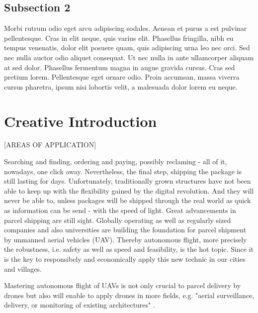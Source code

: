 
\subsection{Subsection 2}
Morbi rutrum odio eget arcu adipiscing sodales. Aenean et purus a est pulvinar pellentesque. Cras in elit neque, quis varius elit. Phasellus fringilla, nibh eu tempus venenatis, dolor elit posuere quam, quis adipiscing urna leo nec orci. Sed nec nulla auctor odio aliquet consequat. Ut nec nulla in ante ullamcorper aliquam at sed dolor. Phasellus fermentum magna in augue gravida cursus. Cras sed pretium lorem. Pellentesque eget ornare odio. Proin accumsan, massa viverra cursus pharetra, ipsum nisi lobortis velit, a malesuada dolor lorem eu neque.


\section{Creative Introduction}

[AREAS OF APPLICATION]

Searching and finding, ordering and paying, possibly reclaming - 
all of it, nowadays, one click away.
Nevertheless, the final step, shipping the package is
still lasting for days. 
Unfortunately, traditionally grown structures
have not been able to keep up with the 
flexibility gained by the digital revolution.
And they will never be able to, unless
packages will be shipped through the real world
as quick as information can be send - with the speed of light.
Great advancements in parcel shipping are still sight.
Globally operating as well as regularly sized companies and
also universities are building the foundation for 
parcel shipment by unmanned aerial vehicles (UAV).
Thereby autonomous flight, more precisely the robustness, i.e. safety
as well as speed and feasibility, is the hot topic. Since it is the key to
responsibely and economically apply this new technic in our cities and villages.

Mastering autonomous flight of UAVs is not only crucial to 
parcel delivery by drones but also will enable to apply drones in more fields,
e.g. "aerial surveillance, delivery, or monitoring of existing architectures"
\cite{loquercio2018learning}.



